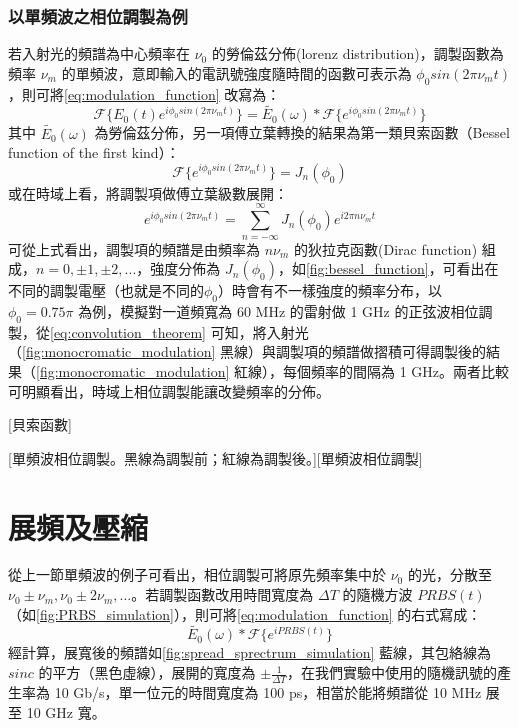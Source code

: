 \documentclass[class=NCU_thesis, crop=false]{standalone}
\begin{document}
\subsubsection{以單頻波之相位調製為例}
若入射光的頻譜為中心頻率在 $\nu_{0}$ 的勞倫茲分佈(lorenz distribution)，調製函數為頻率 $\nu_{m}$ 的單頻波，意即輸入的電訊號強度隨時間的函數可表示為 $\phi_{0} sin(2\pi \nu_{m} t)$，則可將\cref{eq:modulation_function} 改寫為：
\begin{equation}
\label{eq:convolution_theorem}
    \mathscr{F}\{E_{0}(t)e^{i\phi_{0} sin(2\pi \nu_{m} t)}\}=\tilde{E_{0}}(\omega)*\mathscr{F}\{{e^{i\phi_{0} sin(2\pi \nu_{m} t)}}\}
\end{equation}
其中 $\tilde{E_{0}}(\omega)$ 為勞倫茲分佈，另一項傅立葉轉換的結果為第一類貝索函數（Bessel function of the first kind）：
\begin{equation}
    \mathscr{F}\{{e^{i\phi_{0} sin(2\pi \nu_{m} t)}}\}=J_{n}(\phi_{0})
\end{equation}
或在時域上看，將調製項做傅立葉級數展開：
\begin{equation}
    e^{i\phi_{0} sin(2\pi \nu_{m} t)}=\sum_{n=-\infty}^{\infty}J_{n}(\phi_{0})e^{i 2 \pi n \nu_{m} t}
\end{equation}
可從上式看出，調製項的頻譜是由頻率為 $n \nu_{m}$ 的狄拉克函數(Dirac function) 組成，$n=0, \pm1, \pm2, ...$，強度分佈為 $J_{n}(\phi_{0})$，如\cref{fig:bessel_function}，可看出在不同的調製電壓（也就是不同的$\phi_{0}$）時會有不一樣強度的頻率分布，以 $\phi_{0}=0.75\pi$ 為例，模擬對一道頻寬為 60 MHz 的雷射做 1 GHz 的正弦波相位調製，從\cref{eq:convolution_theorem} 可知，將入射光（\cref{fig:monocromatic_modulation} 黑線）與調製項的頻譜做摺積可得調製後的結果（\cref{fig:monocromatic_modulation} 紅線），每個頻率的間隔為 1 GHz。兩者比較可明顯看出，時域上相位調製能讓改變頻率的分佈。

[貝索函數]

[單頻波相位調製。黑線為調製前；紅線為調製後。][單頻波相位調製]


\section{展頻及壓縮}
\label{section:time_delay}
從上一節單頻波的例子可看出，相位調製可將原先頻率集中於 $\nu_{0}$ 的光，分散至 $\nu_{0}\pm\nu_{m}, \nu_{0}\pm2\nu_{m},\dots$。若調製函數改用時間寬度為 $\Delta T$ 的隨機方波 $PRBS(t)$ （如\cref{fig:PRBS_simulation}），則可將\cref{eq:modulation_function} 的右式寫成：
\begin{equation}
    \tilde{E_{0}}(\omega)*\mathscr{F}\{{e^{i PRBS(t)}}\}
\end{equation}
經計算，展寬後的頻譜如\cref{fig:spread_sprectrum_simulation} 藍線，其包絡線為 $sinc$ 的平方（黑色虛線），展開的寬度為 $\pm\frac{1}{\Delta T}$，在我們實驗中使用的隨機訊號的產生率為 10 Gb/s，單一位元的時間寬度為 100 ps，相當於能將頻譜從 10 MHz 展至 10 GHz 寬。
\end{document}
